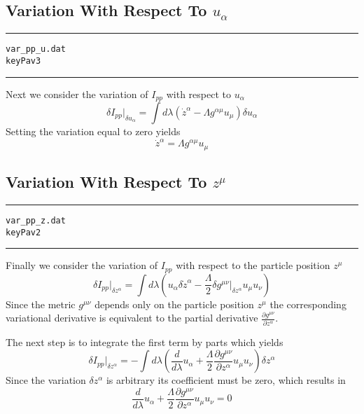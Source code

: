 \documentclass[12pt]{article}
\begin{document}
\subsection{Variation With Respect To $ u_\alpha $}

\clearpage
\vspace{5mm}
\hrule
\begin{alltt}
  var_pp_u.dat
  key Pav3
\end{alltt}
\hrule
\vspace{5mm}

Next we consider the variation of $ I_{pp} $ with respect to $ {u}_{\alpha} $
\begin{equation}\label{Pav3_1}
{ \delta I_{pp} } |_{\delta {u}_{\alpha} } = \int d \lambda \left( {\dot z}^{\alpha}
- \Lambda {g}^{\alpha \mu} {u}_{\mu} \right) \delta {u}_{\alpha}
\end{equation}
Setting the variation equal to zero yields
\begin{equation}\label{Pav3_2}
{\dot z}^{\alpha} = \Lambda {g}^{\alpha \mu} {u}_{\mu}
\end{equation}
\subsection{Variation With Respect To $ z ^ \mu $}

\clearpage
\vspace{5mm}
\hrule
\begin{alltt}
  var_pp_z.dat
  key Pav2
\end{alltt}
\hrule
\vspace{5mm}

Finally we consider the variation of $ I_{pp} $ with respect to
the particle position $ {z ^ \mu} $
\begin{equation}\label{Pav2_1}
{ \delta I_{pp} } |_{\delta {z ^ \alpha} } = \int d \lambda \left( {u}_{\alpha} \delta {\dot z}^{\alpha}
- \frac{\Lambda}{2}
{ \delta {g}^{\mu \nu} } |_{\delta {z ^ \alpha} } {u}_{\mu} {u}_{\nu} \right)
\end{equation}
Since the metric $ {g}^{\mu \nu} $ depends only on the particle position
$ {z ^ \mu} $ the corresponding variational derivative is equivalent to the
partial derivative $ \frac{\partial {g}^{\mu \nu}}{\partial {z ^ \alpha}} $.

The next step is to integrate the first term by parts which yields
\begin{equation}\label{Pav2_2}
{ \delta I_{pp} } |_{\delta {z ^ \alpha} } = - \int d \lambda \left( \frac{ d }{d \lambda} {u}_{\alpha}
+ \frac{\Lambda}{2}
\frac{\partial {g}^{\mu \nu}}{\partial {z ^ \alpha}} {u}_{\mu} {u}_{\nu} \right) \delta {z ^ \alpha}
\end{equation}
Since the variation $ \delta {z ^ \alpha} $ is arbitrary its coefficient must
be zero, which results in
\begin{equation}\label{Pav2_3}
\frac{ d }{d \lambda} {u}_{\alpha} + \frac{\Lambda}{2} \frac{\partial {g}^{\mu \nu}}{\partial {z ^ \alpha}} {u}_{\mu} {u}_{\nu} = 0
\end{equation}
\end{document}
